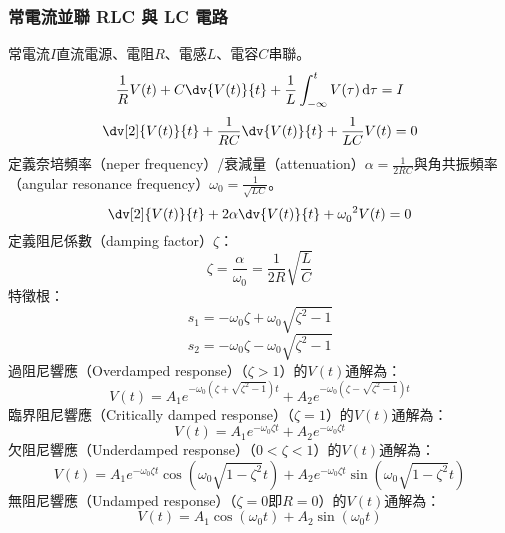 \documentclass[a4paper,12pt]{report}
\begin{document}
\begin{itemize}
\subsubsection{常電流並聯 RLC 與 LC 電路}
常電流$I$直流電源、電阻$R$、電感$L$、電容$C$串聯。
\[\frac{1}{R}V(t)+C\dv{V(t)}{t}+\frac{1}{L}\int _{-\infty}^tV(\tau)\,\mathrm{d}\tau=I\]
\[\dv[2]{V(t)}{t}+\frac{1}{RC}\dv{V(t)}{t}+\frac{1}{LC}V(t)=0\]
定義奈培頻率（neper frequency）/衰減量（attenuation）$\alpha=\frac{1}{2RC}$與角共振頻率（angular resonance frequency）$\omega_0=\frac{1}{\sqrt{LC}}$。
\[\dv[2]{V(t)}{t}+2\alpha\dv{V(t)}{t}+\omega_0^{\phantom{0}2}V(t)=0\]
定義阻尼係數（damping factor）$\zeta$：
\[\zeta=\frac{\alpha}{\omega_0}=\frac{1}{2R}\sqrt{\frac{L}{C}}\]
特徵根：
\[s_1=-\omega_0\zeta+\omega_0\sqrt{\zeta^2-1}\]
\[s_2=-\omega_0\zeta-\omega_0\sqrt{\zeta^2-1}\]
過阻尼響應（Overdamped response）（$\zeta>1$）的$V(t)$通解為：
\[V(t)=A_1e^{-\omega_0\left(\zeta+\sqrt{\zeta^2-1}\right)t}+A_2e^{-\omega_0\left(\zeta-\sqrt{\zeta^2-1}\right)t}\]
臨界阻尼響應（Critically damped response）（$\zeta=1$）的$V(t)$通解為：
\[V(t)=A_1e^{-\omega_0\zeta t}+A_2e^{-\omega_0\zeta t}\]
欠阻尼響應（Underdamped response）（$0<\zeta<1$）的$V(t)$通解為：
\[V(t)=A_1e^{-\omega_0\zeta t}\cos\left(\omega_0\sqrt{1-\zeta^2}t\right)+A_2e^{-\omega_0\zeta t}\sin\left(\omega_0\sqrt{1-\zeta^2}t\right)\]
無阻尼響應（Undamped response）（$\zeta=0$即$R=0$）的$V(t)$通解為：
\[V(t)=A_1\cos\left(\omega_0t\right)+A_2\sin\left(\omega_0t\right)\]

\end{itemize}
\end{document}
